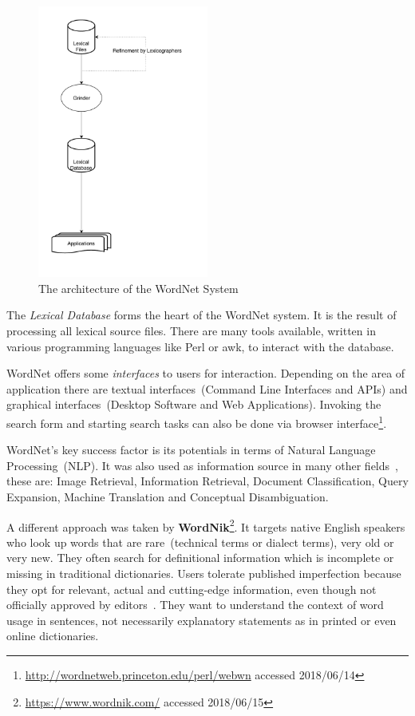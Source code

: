 \documentclass[draft,final]{vutinfth} %
\begin{document}
\begin{figure}
	 \centering
	 \includegraphics[width=0.5\textwidth]{drawio/WordNet_Architecture}
	 \caption{The architecture of the WordNet System~\cite{fellbaum1998}}\label{fig:wordnet_architecture}
\end{figure}


The \textit{Lexical Database} forms the heart of the WordNet system. It is the result of processing all lexical source files. There are many tools available, written in various programming languages like Perl or awk, to interact with the database. 

WordNet offers some \textit{interfaces} to users for interaction. Depending on the area of application there are textual interfaces~(Command Line Interfaces and APIs) and graphical interfaces~(Desktop Software and Web Applications). Invoking the search form and starting search tasks can also be done via browser interface\footnote{\url{http://wordnetweb.princeton.edu/perl/webwn} accessed 2018/06/14}.

WordNet's key success factor is its potentials in terms of Natural Language Processing~(NLP). It was also used as information source in many other fields~\cite{morato2004}, these are: Image Retrieval, Information Retrieval, Document Classification, Query Expansion, Machine Translation and Conceptual Disambiguation.

A different approach was taken by \textbf{WordNik}\footnote{\url{https://www.wordnik.com/} accessed 2018/06/15}. It targets native English speakers who look up words that are rare~(technical terms or dialect terms), very old or very new. They often search for definitional information which is incomplete or missing in traditional dictionaries. Users tolerate published imperfection because they opt for relevant, actual and cutting-edge information, even though not officially approved by editors~\cite{burnett1979}. They want to understand the context of word usage in sentences, not necessarily explanatory statements as in printed or even online dictionaries.
\end{document}
